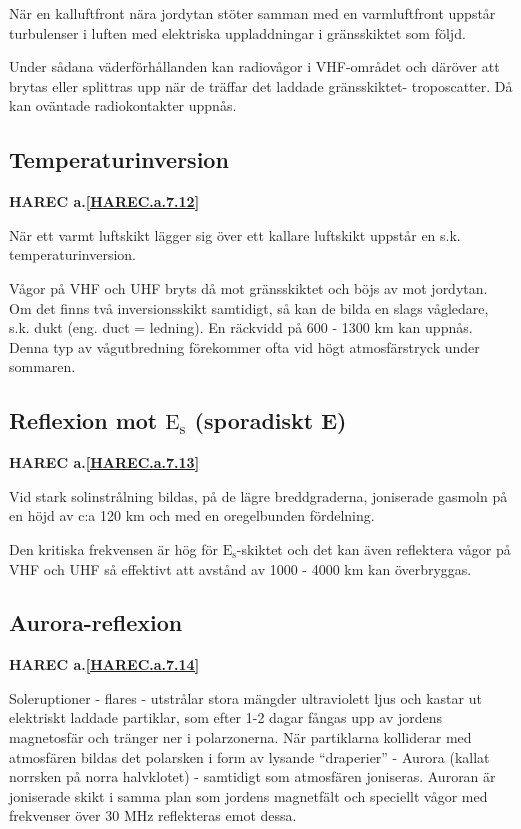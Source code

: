 När en kalluftfront nära jordytan stöter samman med en varmluftfront
uppstår turbulenser i luften med elektriska uppladdningar i
gränsskiktet som följd.

Under sådana väderförhållanden kan radiovågor i VHF-området och
däröver att brytas eller splittras upp när de träffar det laddade
gränsskiktet- troposcatter. Då kan oväntade radiokontakter uppnås.

\subsection{Temperaturinversion}
\textbf{
HAREC a.\ref{HAREC.a.7.12}\label{myHAREC.a.7.12}
}

När ett varmt luftskikt lägger sig över ett kallare luftskikt uppstår
en s.k. temperaturinversion.

Vågor på VHF och UHF bryts då mot gränsskiktet och böjs av mot
jordytan. Om det finns två inversionsskikt samtidigt, så kan de bilda
en slags vågledare, s.k. dukt (eng. duct = ledning). En räckvidd på
600 - 1300 km kan uppnås. Denna typ av vågutbredning förekommer ofta
vid högt atmosfärstryck under sommaren.

\subsection{Reflexion mot \(\mathrm{E_s}\) (sporadiskt E)}
\textbf{
HAREC a.\ref{HAREC.a.7.13}\label{myHAREC.a.7.13}
}

Vid stark solinstrålning bildas, på de lägre breddgraderna, joniserade
gasmoln på en höjd av c:a 120 km och med en oregelbunden fördelning.

Den kritiska frekvensen är hög för \(\mathrm{E_s}\)-skiktet och det
kan även reflektera vågor på VHF och UHF så effektivt att avstånd av
1000 - 4000 km kan överbryggas.

\subsection{Aurora-reflexion}
\textbf{
HAREC a.\ref{HAREC.a.7.14}\label{myHAREC.a.7.14}
}

Soleruptioner - flares - utstrålar stora mängder ultraviolett ljus och
kastar ut elektriskt laddade partiklar, som efter 1-2 dagar fångas upp
av jordens magnetosfär och tränger ner i polarzonerna. När partiklarna
kolliderar med atmosfären bildas det polarsken i form av lysande
``draperier'' - Aurora (kallat norrsken på norra halvklotet) - samtidigt
som atmosfären joniseras. Auroran är joniserade skikt i samma plan som
jordens magnetfält och speciellt vågor med frekvenser över 30 MHz
reflekteras emot dessa.

